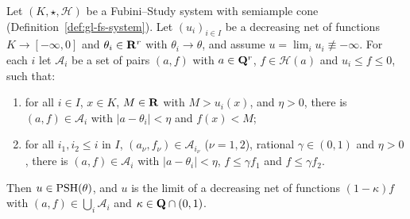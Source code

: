 \begin{lemma}\label{lem:nn-mult-diagonal}
\leanok
{}
Let $(K,\star,\mathcal H)$ be a Fubini--Study system with semiample cone (Definition~\ref{def:gl-fs-system}). Let $(u_i)_{i\in I}$ be a
decreasing net of functions $K\to[-\infty,0]$ and $\theta_i\in\mathbf{R}^r$ with $\theta_i\to\theta$, and assume $u=\lim_iu_i\not\equiv-\infty$.
For each $i$ let $\mathcal A_i$ be a set of pairs $(a,f)$ with $a\in\mathbf{Q}^r$, $f\in\mathcal H(a)$ and $u_i\le f\le0$, such that:
\begin{enumerate}
\item[(A)] for all $i\in I$, $x\in K$, $M\in\mathbf{R}$ with $M>u_i(x)$, and $\eta>0$, there is $(a,f)\in\mathcal A_i$ with $|a-\theta_i|<\eta$ and
$f(x)<M$;
\item[(B)] for all $i_1,i_2\le i$ in $I$, $(a_\nu,f_\nu)\in\mathcal A_{i_\nu}$ ($\nu=1,2$), rational $\gamma\in(0,1)$ and $\eta>0$, there is
$(a,f)\in\mathcal A_i$ with $|a-\theta_i|<\eta$, $f\le\gamma f_1$ and $f\le\gamma f_2$.
\end{enumerate}
Then $u\in\operatorname{PSH}(\theta)$, and $u$ is the limit of a decreasing net of functions $(1-\kappa)f$ with $(a,f)\in\bigcup_i\mathcal A_i$ and
$\kappa\in\mathbf{Q}\cap(0,1)$.
\end{lemma}

